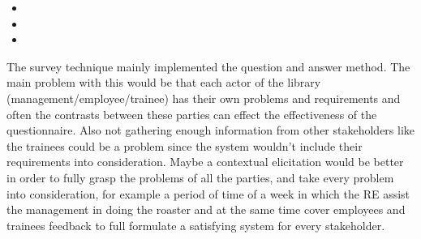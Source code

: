 \begin{elenco}
	\begin{itemize}
		\item 
		\item 
		\item 
	\end{itemize}
	\item 
	\item The survey technique mainly implemented the question and answer method. The main problem with this would be that each actor of the library (management/employee/trainee) has their own problems and requirements and often the contrasts between these parties can effect the effectiveness of the questionnaire. Also not gathering enough information from other stakeholders like the trainees could be a problem since the system wouldn't include their requirements into consideration. Maybe a contextual elicitation would be better in order to fully grasp the problems of all the parties, and take every problem into consideration, for example a period of time of a week in which the RE assist the management in doing the roaster and at the same time cover employees and trainees feedback to full formulate a satisfying system for every stakeholder.
\end{elenco}